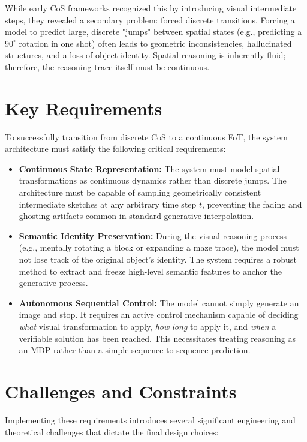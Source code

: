 \documentclass{l4proj}
\begin{document}
While early CoS frameworks recognized this by introducing visual intermediate steps, they revealed a secondary problem: forced discrete transitions. Forcing a model to predict large, discrete "jumps" between spatial states (e.g., predicting a $90^\circ$ rotation in one shot) often leads to geometric inconsistencies, hallucinated structures, and a loss of object identity. Spatial reasoning is inherently fluid; therefore, the reasoning trace itself must be continuous.

\section{Key Requirements}
To successfully transition from discrete CoS to a continuous FoT, the system architecture must satisfy the following critical requirements:

\begin{itemize}
    \item \textbf{Continuous State Representation:} The system must model spatial transformations as continuous dynamics rather than discrete jumps. The architecture must be capable of sampling geometrically consistent intermediate sketches at any arbitrary time step $t$, preventing the fading and ghosting artifacts common in standard generative interpolation.
    \item \textbf{Semantic Identity Preservation:} During the visual reasoning process (e.g., mentally rotating a block or expanding a maze trace), the model must not lose track of the original object's identity. The system requires a robust method to extract and freeze high-level semantic features to anchor the generative process.
    \item \textbf{Autonomous Sequential Control:} The model cannot simply generate an image and stop. It requires an active control mechanism capable of deciding \emph{what} visual transformation to apply, \emph{how long} to apply it, and \emph{when} a verifiable solution has been reached. This necessitates treating reasoning as an MDP rather than a simple sequence-to-sequence prediction.
\end{itemize}

\section{Challenges and Constraints}
Implementing these requirements introduces several significant engineering and theoretical challenges that dictate the final design choices:
\end{document}
